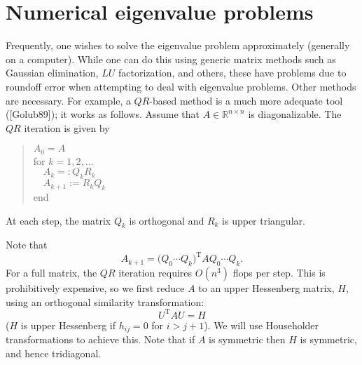 \documentclass{article}
\begin{document}
\section*{Numerical eigenvalue problems}
Frequently, one wishes to solve the eigenvalue problem approximately (generally on a computer).  While one can do this using generic matrix methods such as Gaussian elimination, $LU$ factorization, and others, these have problems due to roundoff error when attempting to deal with eigenvalue problems.  Other methods are necessary.  For example, a $QR$-based method is a much more adequate tool ([Golub89]); it works as follows.
Assume that $A\in\mathbb R^{n\times n}$ is diagonalizable. The $QR$ iteration is given by
\begin{quote}
$A_0 = A$\\
for $k = 1,2,\ldots$\\
$\quad A_k =: Q_kR_k$\\
$\quad A_{k+1} := R_kQ_k$\\
end
\end{quote}
At each step, the matrix $Q_k$ is orthogonal and $R_k$ is upper triangular.

Note that 
\[
 A_{k+1} = \big(Q_0\cdots Q_k)^{\mathrm T}AQ_0\cdots Q_k.
\]
For a full matrix, the $QR$ iteration requires $O(n^3)$ flops per step. This is prohibitively expensive, so we first reduce $A$ to an upper Hessenberg matrix, $H$, using an orthogonal similarity transformation:
\[ 
 U^{\mathrm T}AU = H
\]
($H$ is upper Hessenberg if $h_{ij} = 0$ for $i>j+1$). We will use Householder transformations to achieve this. Note that if $A$ is symmetric then $H$ is symmetric, and hence tridiagonal. 
\end{document}
